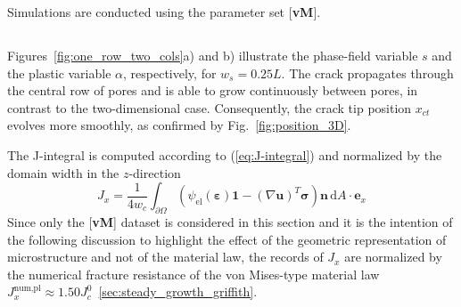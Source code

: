 \documentclass[pdflatex,sn-mathphys-num]{sn-jnl}%
\newcommand{\vMLabel}{[\textbf{vM}]\xspace}
\theoremstyle{thmstyleone}%
\theoremstyle{thmstyletwo}%
\theoremstyle{thmstylethree}%
\begin{document}
Simulations are conducted  using the parameter set \vMLabel.

\subsection{}
\label{sec:3D_fracture_behavior}

Figures~\ref{fig:one_row_two_cols}a) and b) illustrate the phase-field variable $s$ and the plastic variable $\alpha$, respectively, for $w_s=0.25L$. The crack propagates through the central row of pores and is able to grow continuously between pores, in contrast to the two-dimensional case. Consequently, the crack tip position $x_{ct}$ evolves more smoothly, as confirmed by Fig.~\ref{fig:position_3D}.

The J-integral is computed according to (\ref{eq:J-integral}) and normalized by the domain width in the $z$-direction
\begin{equation}
    J_x = \dfrac{1}{4 w_c}\int_{\partial\Omega}\left(\psi_{\text{el}}(\boldsymbol{\varepsilon})\boldsymbol{1} - (\nabla\boldsymbol{u})^T\boldsymbol{\sigma}\right)\boldsymbol{n}\,\mathrm{d}A\cdot\boldsymbol{e}_x
\end{equation}
Since only the \vMLabel dataset is considered in this section and it is the intention of the following discussion
to highlight the effect of the geometric representation of microstructure and 
not of the material law, the records of $J_x$ are normalized by the 
numerical fracture resistance of the von Mises-type material law $J_x^{\text{num,pl}}\approx1.50J_c^0$~\ref{sec:steady_growth_griffith}.
\end{document}
